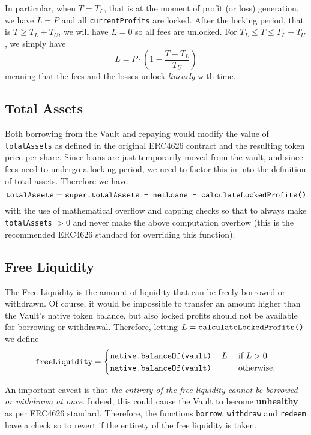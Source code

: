\documentclass[a4paper,10 pt]{article}
\theoremstyle{definition}
\begin{document}
In particular, when $T = T_L$, that is at the moment of profit (or loss) generation, we have $L = P$ and all \verb|currentProfits| are locked. After the locking period, that is $T \ge T_L + T_U$, we will have $L=0$ so all fees are unlocked. For $T_L \le T \le T_L + T_U$, we simply have $$L = P\cdot\left(1- \frac{T - T_L}{T_U} \right)$$ meaning that the fees and the losses unlock {\it linearly} with time.

\subsection{Total Assets}\label{totalAssetsSub}

Both borrowing from the Vault and repaying would modify the value of \verb|totalAssets| as defined in the original ERC4626 contract and the resulting token price per share. Since loans are just temporarily moved from the vault, and since fees need to undergo a locking period, we need to factor this in into the definition of total assets. Therefore we have $$\verb|totalAssets| = \verb|super.totalAssets + netLoans - calculateLockedProfits()|$$ with the use of mathematical overflow and capping checks so that to always make \verb|totalAssets| $> 0$ and never make the above computation overflow (this is the recommended ERC4626 standard for overriding this function).

\subsection{Free Liquidity}\label{freeLiquidity}

The Free Liquidity is the amount of liquidity that can be freely borrowed or withdrawn. Of course, it would be impossible to transfer an amount higher than the Vault's native token balance, but also locked profits should not be available for borrowing or withdrawal. Therefore, letting $L = \verb|calculateLockedProfits()|$ we define
$$\verb|freeLiquidity| = \begin{cases}
\verb|native.balanceOf(vault)| - L &\text{ if } L > 0 \\

\verb|native.balanceOf(vault)| &\text{ otherwise}.
\end{cases} $$

An important caveat is that {\it the entirety of the free liquidity cannot be borrowed or withdrawn at once}. Indeed, this could cause the Vault to become {\bf unhealthy} as per ERC4626 standard. Therefore, the functions \verb|borrow|, \verb|withdraw| and \verb|redeem| have a check so to revert if the entirety of the free liquidity is taken. 
\end{document}
